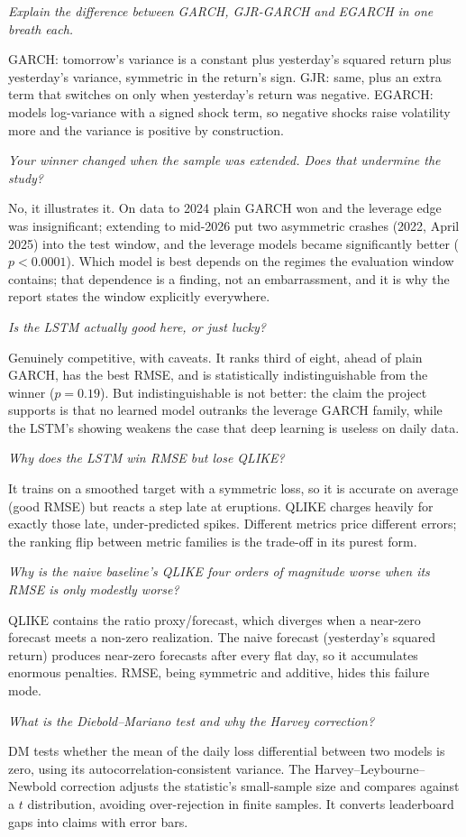 \documentclass[a4paper,11pt]{article}
\newenvironment{qa}{\begin{description}[leftmargin=0pt,itemsep=6pt]}{\end{description}}
\newcommand{\Q}[1]{\item[Q.] \textit{#1}}
\newcommand{\A}{\item[A.]}
\begin{document}
\begin{qa}
\Q{Explain the difference between GARCH, GJR-GARCH and EGARCH in one breath each.}
\A GARCH: tomorrow's variance is a constant plus yesterday's squared return plus yesterday's variance, symmetric in the return's sign. GJR: same, plus an extra term that switches on only when yesterday's return was negative. EGARCH: models log-variance with a signed shock term, so negative shocks raise volatility more and the variance is positive by construction.

\Q{Your winner changed when the sample was extended. Does that undermine the study?}
\A No, it illustrates it. On data to 2024 plain GARCH won and the leverage edge was insignificant; extending to mid-2026 put two asymmetric crashes (2022, April 2025) into the test window, and the leverage models became significantly better ($p<0.0001$). Which model is best depends on the regimes the evaluation window contains; that dependence is a finding, not an embarrassment, and it is why the report states the window explicitly everywhere.

\Q{Is the LSTM actually good here, or just lucky?}
\A Genuinely competitive, with caveats. It ranks third of eight, ahead of plain GARCH, has the best RMSE, and is statistically indistinguishable from the winner ($p=0.19$). But indistinguishable is not better: the claim the project supports is that no learned model outranks the leverage GARCH family, while the LSTM's showing weakens the case that deep learning is useless on daily data.

\Q{Why does the LSTM win RMSE but lose QLIKE?}
\A It trains on a smoothed target with a symmetric loss, so it is accurate on average (good RMSE) but reacts a step late at eruptions. QLIKE charges heavily for exactly those late, under-predicted spikes. Different metrics price different errors; the ranking flip between metric families is the trade-off in its purest form.

\Q{Why is the naive baseline's QLIKE four orders of magnitude worse when its RMSE is only modestly worse?}
\A QLIKE contains the ratio proxy/forecast, which diverges when a near-zero forecast meets a non-zero realization. The naive forecast (yesterday's squared return) produces near-zero forecasts after every flat day, so it accumulates enormous penalties. RMSE, being symmetric and additive, hides this failure mode.

\Q{What is the Diebold–Mariano test and why the Harvey correction?}
\A DM tests whether the mean of the daily loss differential between two models is zero, using its autocorrelation-consistent variance. The Harvey–Leybourne–Newbold correction adjusts the statistic's small-sample size and compares against a $t$ distribution, avoiding over-rejection in finite samples. It converts leaderboard gaps into claims with error bars.


\end{qa}
\end{document}
